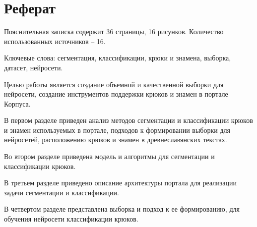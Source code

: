 \chapter*{Реферат}
\thispagestyle{plain}

Пояснительная записка содержит 36 страницы, 16 рисунков. Количество использованных источников – 16.


Ключевые слова: сегментация, классификации, крюки и знамена, выборка, датасет, нейросети.


Целью работы является создание объемной и качественной выборки для нейросети, создание инструментов 
поддержки крюков и знамен в портале Корпуса.


В первом разделе приведен анализ методов сегментации и классификации крюков и знамен используемых в портале, 
подходов к формировании выборки для нейросетей, расположению крюков и знамен в древнеславянских текстах.


Во втором разделе приведена модель и алгоритмы для сегментации и классификации крюков.


В третьем разделе приведено описание архитектуры портала для реализации задачи сегментации и классификации.


В четвертом разделе представлена выборка и подход к ее формированию, для обучения нейросети классификации крюков.


